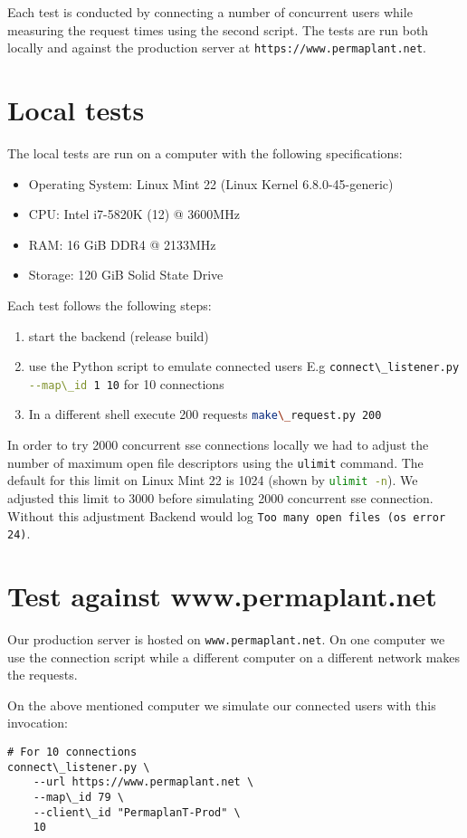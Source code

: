 \documentclass[final,oneside]{vutinfth}
\newcommand{\bashsnippet}[1]{\lstinline[language=bash]{#1}}
\newcommand{\urlsnippet}[1]{\lstinline[language=url]{#1}}
\begin{document}
Each test is conducted by connecting a number of concurrent users while measuring the request times using the second script. The tests are run both locally and against the production server at \urlsnippet{https://www.permaplant.net}.

\section{Local tests}

The local tests are run on a computer with the following specifications:
\begin{itemize}
  \item Operating System: Linux Mint 22 (Linux Kernel 6.8.0-45-generic)
  \item CPU: Intel i7-5820K (12) @ 3600MHz
  \item RAM: 16 GiB DDR4 @ 2133MHz
  \item Storage: 120 GiB Solid State Drive
\end{itemize}

Each test follows the following steps:
\begin{enumerate}
    \item start the backend (release build)
    \item use the Python script to emulate connected users
    E.g \bashsnippet{connect\_listener.py --map\_id 1 10} for 10 connections
    \item In a different shell execute 200 requests \bashsnippet{make\_request.py 200}
\end{enumerate}

In order to try 2000 concurrent \gls{sse} connections locally we had to adjust the number of maximum open file descriptors using the \texttt{ulimit} command.
The default for this limit on Linux Mint 22 is 1024 (shown by \bashsnippet{ulimit -n}).
We adjusted this limit to 3000 before simulating 2000 concurrent \gls{sse} connection.
Without this adjustment Backend would log \texttt{Too many open files (os error 24)}.

\section{Test against www.permaplant.net}

Our production server is hosted on \urlsnippet{www.permaplant.net}.
On one computer we use the connection script while a different computer on a different network makes the requests.

On the above mentioned computer we simulate our connected users with this invocation: 
\begin{verbatim}
# For 10 connections
connect\_listener.py \
    --url https://www.permaplant.net \
    --map\_id 79 \
    --client\_id "PermaplanT-Prod" \
    10 
\end{verbatim}
\end{document}
